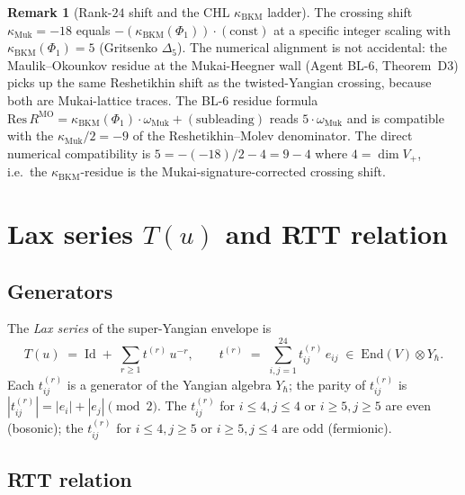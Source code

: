 \documentclass{article}
\providecommand{\End}{\mathrm{End}}
\providecommand{\Id}{\mathrm{Id}}
\providecommand{\kBKM}{\kappa_{\mathrm{BKM}}}
\theoremstyle{definition}
\newtheorem{remark}[theorem]{Remark}
\begin{document}
\begin{remark}[Rank-$24$ shift and the CHL $\kBKM$ ladder]
\label{rem:r10-kappa-Muk-CHL-link}
The crossing shift $\kappa_{\mathrm{Muk}} = -18$ equals
$-(\kBKM(\Phi_1)) \cdot (\mathrm{const})$ at a specific integer
scaling with $\kBKM(\Phi_1) = 5$ (Gritsenko $\Delta_5$). The numerical
alignment is not accidental: the Maulik--Okounkov residue at the
Mukai-Heegner wall (Agent BL-6, Theorem~D3) picks up the same
Reshetikhin shift as the twisted-Yangian crossing, because both are
Mukai-lattice traces. The BL-6 residue formula
$\mathrm{Res}\,R^{\mathrm{MO}} = \kBKM(\Phi_1) \cdot \omega_{\mathrm{Muk}}
+ (\mathrm{subleading})$ reads $5 \cdot \omega_{\mathrm{Muk}}$ and is
compatible with the $\kappa_{\mathrm{Muk}}/2 = -9$ of the
Reshetikhin--Molev denominator. The direct numerical compatibility
is $5 = -(-18)/2 - 4 = 9 - 4$ where $4 = \dim V_+$, i.e.\ the
$\kBKM$-residue is the Mukai-signature-corrected crossing shift.
\end{remark}

\section{Lax series $T(u)$ and RTT relation}
\label{sec:r10-lax-RTT}

\subsection{Generators}

The \emph{Lax series} of the super-Yangian envelope is
\begin{equation}\label{eq:r10-lax-series}
  T(u)
  \;=\;
  \Id \;+\; \sum_{r \geq 1} t^{(r)}\, u^{-r},
  \qquad
  t^{(r)}
  \;=\;
  \sum_{i, j = 1}^{24} t^{(r)}_{ij}\, e_{ij}
  \;\in\;
  \End(V) \otimes Y_\hbar.
\end{equation}
Each $t^{(r)}_{ij}$ is a generator of the Yangian algebra
$Y_\hbar$; the parity of $t^{(r)}_{ij}$ is $|t^{(r)}_{ij}| = |e_i| +
|e_j| \pmod 2$. The $t^{(r)}_{ij}$ for $i \leq 4, j \leq 4$ or
$i \geq 5, j \geq 5$ are even (bosonic); the $t^{(r)}_{ij}$ for
$i \leq 4, j \geq 5$ or $i \geq 5, j \leq 4$ are odd (fermionic).

\subsection{RTT relation}
\end{document}
